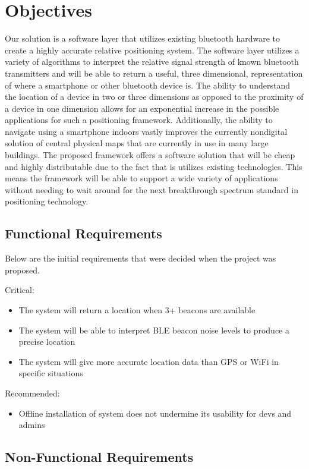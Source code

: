 \section{Objectives}

Our solution
is a software layer that utilizes existing bluetooth hardware to create a highly accurate relative positioning system.
The software layer utilizes a variety of algorithms to interpret the relative signal strength of known bluetooth transmitters
and will be able to return a useful, three dimensional, representation of where a smartphone or other bluetooth device is.
The ability to understand the location of a device in two or three dimensions as opposed to the proximity of a device in one
dimension allows for an exponential increase in the possible applications for such a positioning framework.  Additionally,
the ability to navigate using a smartphone indoors vastly improves the currently nondigital solution of central physical maps
that are currently in use in many large buildings.  The proposed framework offers a software solution that will be cheap and
highly distributable due to the fact that is utilizes existing technologies.  This means the framework will be able to support a
wide variety of applications without needing to wait around for the next breakthrough spectrum standard in positioning technology.

\subsection{Functional Requirements}
Below are the initial requirements that were decided when the project was proposed.
\newline

Critical:
\begin{itemize}
\item The system will return a location when 3+ beacons are available
\item The system will be able to interpret BLE beacon noise levels to produce a precise location
\item The system will give more accurate location data than GPS or WiFi in specific situations
\end{itemize}
Recommended:
\begin{itemize}
\item Offline installation of system does not undermine its usability for devs and admins
\end{itemize}

\subsection{Non-Functional Requirements}


